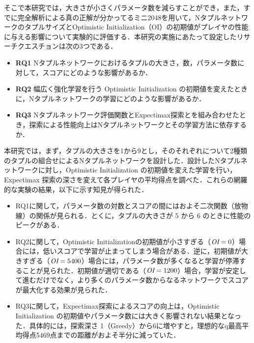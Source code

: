 そこで本研究では，大きさが小さくパラメータ数を減らすことができ，また，すでに完全解析による真の正解が分かってるミニ2048を用いて，NタプルネットワークのタプルサイズとOptimistic Initialization（OI）の初期値がプレイヤの性能に与える影響について実験的に評価する．本研究の実施にあたって設定したリサーチクエスチョンは次の3つである．
\begin{itemize}
\item \textbf{RQ1} Nタプルネットワークにおけるタプルの大きさ，数，パラメータ数に対して，スコアにどのような影響があるか．
\item \textbf{RQ2} 幅広く強化学習を行う Optimistic Initialization の初期値を変えたときに，Nタプルネットワークの学習にどのような影響があるか．
\item \textbf{RQ3} Nタプルネットワーク評価関数とExpectimax探索とを組み合わせたとき，探索による性能向上はNタプルネットワークとその学習方法に依存するか．
\end{itemize}

本研究では，まず，タプルの大きさを1から9とし，そのそれぞれについて2種類のタプルの組合せによるNタプルネットワークを設計した．設計したNタプルネットワークに対し，Optimistic Initialization の初期値を変えた学習を行い，Expectimax 探索の深さを変えて各プレイヤの平均得点を調べた．これらの網羅的な実験の結果，以下に示す知見が得られた．
\begin{itemize}
\item RQ1に関して，パラメータ数の対数とスコアの間にはおよそ二次関数（放物線）の関係が見られる．とくに，タプルの大きさが 5 から 6 のときに性能のピークがある．
\item RQ2に関して，Optimistic Initializationの初期値が小さすぎる（$\mbox{\itshape OI} = 0$）場合には，低いスコアで学習が止まってしまう場合がある．逆に，初期値が大きすぎる（$\mbox{\itshape OI} = 5400$）場合には，パラメータ数が多くなると学習が停滞することが見られた．初期値が適切である（$\mbox{\itshape OI} = 1200$）場合，学習が安定して進むだけでなく，より多くのパラメータ数からなるネットワークでスコアが最大化する効果が見られた．
\item RQ3に関して，Expectimax探索によるスコアの向上は，Optimistic Initialization の初期値やパラメータ数には大きく影響されない結果となった．具体的には，探索深さ  1（Greedy）から6に増やすと，理想的なq最高平均得点5469点までの距離がおよそ半分に減っていた．
\end{itemize}

